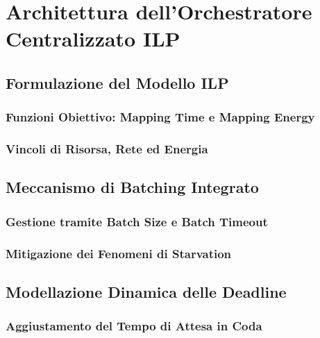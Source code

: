 \chapter{Architettura dell'Orchestratore Centralizzato ILP}
\label{chap:architettura_ilp}

\section{Formulazione del Modello ILP}
\subsection{Funzioni Obiettivo: Mapping Time e Mapping Energy}
\subsection{Vincoli di Risorsa, Rete ed Energia}

\section{Meccanismo di Batching Integrato}
\subsection{Gestione tramite Batch Size e Batch Timeout}
\subsection{Mitigazione dei Fenomeni di Starvation}

\section{Modellazione Dinamica delle Deadline}
\subsection{Aggiustamento del Tempo di Attesa in Coda}